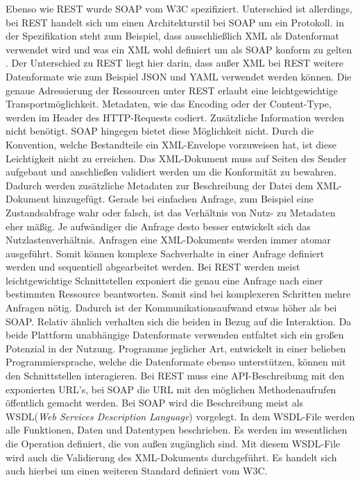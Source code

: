 \documentclass[fleqn,10.5pt,ngerman]{SelfArx}
\begin{document}
Ebenso wie REST wurde SOAP vom W3C spezifiziert. Unterschied ist allerdings, bei REST handelt sich um einen Architekturstil bei SOAP um ein Protokoll. in der Spezifikation steht zum Beispiel, dass ausschließlich XML als Datenformat verwendet wird und was ein XML wohl definiert um als SOAP konform zu gelten \cite{w3cSOAP}. Der Unterschied zu REST liegt hier darin, dass außer XML bei REST weitere Datenformate wie zum Beispiel JSON und YAML verwendet werden können. Die genaue Adressierung der Ressourcen unter REST erlaubt eine leichtgewichtige Transportmöglichkeit. Metadaten, wie das Encoding oder der Content-Type, werden im Header des HTTP-Requests codiert. Zusätzliche Information werden nicht benötigt. SOAP hingegen bietet diese Möglichkeit nicht. Durch die Konvention, welche Bestandteile ein XML-Envelope vorzuweisen hat, ist diese Leichtigkeit nicht zu erreichen. Das XML-Dokument muss auf Seiten des Sender aufgebaut und anschließen validiert werden um die Konformität zu bewahren. Dadurch werden zusätzliche Metadaten zur Beschreibung der Datei dem XML-Dokument hinzugefügt. Gerade bei einfachen Anfrage, zum Beispiel eine Zustandsabfrage wahr oder falsch, ist das Verhältnis von Nutz- zu Metadaten eher mäßig. Je aufwändiger die Anfrage desto besser entwickelt sich das Nutzlastenverhältnis. Anfragen eine XML-Dokuments werden immer atomar ausgeführt. Somit können komplexe Sachverhalte in einer Anfrage definiert werden und sequentiell abgearbeitet werden. Bei REST werden meist leichtgewichtige Schnittstellen exponiert die genau eine Anfrage nach einer bestimmten Ressource beantworten. Somit sind bei komplexeren Schritten mehre Anfragen nötig. Dadurch ist der Kommunikationsaufwand etwas höher als bei SOAP. Relativ ähnlich verhalten sich die beiden in Bezug auf die Interaktion. Da beide Plattform unabhängige Datenformate verwenden entfaltet sich ein großen Potenzial in der Nutzung. Programme jeglicher Art, entwickelt in einer belieben Programmiersprache, welche die Datenformate ebenso unterstützen, können mit den Schnittstellen interagieren. Bei REST muss eine API-Beschreibung mit den exponierten URL's, bei SOAP die URL mit den möglichen Methodenaufrufen öffentlich gemacht werden. Bei SOAP wird die Beschreibung meist als WSDL(\textit{Web Services Description Language}) \cite{w3cWSDL} vorgelegt. In dem WSDL-File werden alle Funktionen, Daten und Datentypen beschrieben. Es werden im wesentlichen die Operation definiert, die von außen zugänglich sind. Mit diesem WSDL-File wird auch die Validierung des XML-Dokuments durchgeführt. Es handelt sich auch hierbei um einen weiteren Standard definiert vom W3C.
\end{document}

